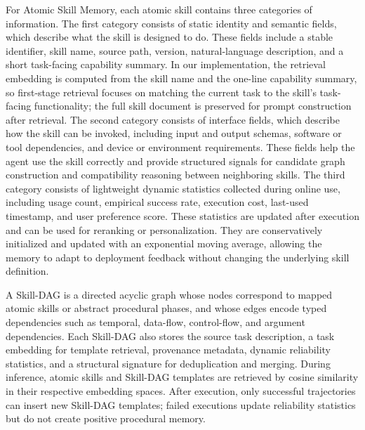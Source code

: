 \documentclass[letterpaper]{article}
\begin{document}
For Atomic Skill Memory, each atomic skill contains three categories of
information. The first category consists of static identity and semantic fields,
which describe what the skill is designed to do. These fields include a stable
identifier, skill name, source path, version, natural-language description, and
a short task-facing capability summary. In our implementation, the retrieval
embedding is computed from the skill name and the one-line capability summary,
so first-stage retrieval focuses on matching the current task to the skill's
task-facing functionality; the full skill document is preserved for prompt
construction after retrieval. The second category consists of interface fields,
which describe how the skill can be invoked, including input and output schemas,
software or tool dependencies, and device or environment requirements. These
fields help the agent use the skill correctly and provide structured signals
for candidate graph construction and compatibility reasoning between neighboring
skills. The third category consists of lightweight dynamic statistics collected
during online use, including usage count, empirical success rate, execution
cost, last-used timestamp, and user preference score. These statistics are
updated after execution and can be used for reranking or personalization. They
are conservatively initialized and updated with an exponential moving average,
allowing the memory to adapt to deployment feedback without changing the
underlying skill definition.

A Skill-DAG is a directed acyclic graph whose nodes correspond to mapped atomic
skills or abstract procedural phases, and whose edges encode typed dependencies
such as temporal, data-flow, control-flow, and argument dependencies. Each
Skill-DAG also stores the source task description, a task embedding for template
retrieval, provenance metadata, dynamic reliability statistics, and a structural
signature for deduplication and merging. During inference, atomic skills and
Skill-DAG templates are retrieved by cosine similarity in their respective
embedding spaces. After execution, only successful trajectories can insert new
Skill-DAG templates; failed executions update reliability statistics but do not
create positive procedural memory.
\end{document}
